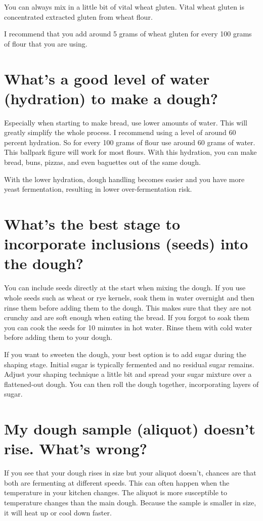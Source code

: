 You can always mix in a little bit of vital wheat gluten. Vital wheat gluten
is concentrated extracted gluten from wheat flour.

I recommend that you add around 5 grams of wheat gluten for every 100 grams of
flour that you are using.

\section{What's a good level of water (hydration) to make a dough?}

Especially when starting to make bread, use lower amounts of water. This will
greatly simplify the whole process. I recommend using a level of around 60
percent hydration. So for every 100 grams of flour use around 60 grams of water.
This ballpark figure will work for most flours. With this hydration, you can
make bread, buns, pizzas, and even baguettes out of the same dough.

With the lower hydration, dough handling becomes easier and you have more yeast
fermentation, resulting in lower over-fermentation risk.

\section{What's the best stage to incorporate inclusions (seeds) into the dough?}

You can include seeds directly at the start when mixing the dough. If you use
whole seeds such as wheat or rye kernels, soak them in water overnight and
then rinse them before adding them to the dough. This makes sure that they
are not crunchy and are soft enough when eating the bread. If you forgot to soak
them you can cook the seeds for 10 minutes in hot water. Rinse them with cold
water before adding them to your dough.

If you want to sweeten the dough, your best option is to add sugar during the
shaping stage. Initial sugar is typically fermented and no residual sugar
remains. Adjust your shaping technique a little bit and spread your sugar
mixture over a flattened-out dough. You can then roll the dough together,
incorporating layers of sugar.

\section{My dough sample (aliquot) doesn't rise. What's wrong?}

If you see that your dough rises in size but your aliquot doesn't, chances
are that both are fermenting at different speeds. This can often
happen when the temperature in your kitchen changes. The aliquot
is more susceptible to temperature changes than the main dough.
Because the sample is smaller in size, it will heat up or cool down
faster.

